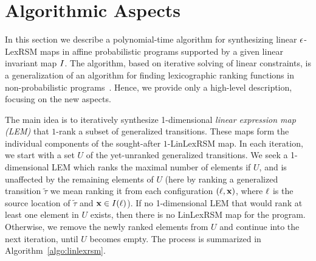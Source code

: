 \section{Algorithmic Aspects}
\label{sec:algo}

In this section we describe a polynomial-time algorithm for synthesizing linear 
$\epsilon$-LexRSM maps in affine probabilistic programs supported by a given linear 
invariant map $I$. The algorithm, based on iterative solving of linear 
constraints, is a generalization of an algorithm for finding 
lexicographic ranking functions in non-probabilistic 
programs~\cite{ADFG10:lexicographic}. Hence, we provide only a high-level 
description, focusing on the new aspects.

The main idea is to iteratively synthesize 1-dimensional {\em linear expression 
map (LEM)} that $1$-rank a subset of generalized transitions. These maps form 
the individual components of the sought-after $1$-LinLexRSM map. In each 
iteration, we start with a set $U$ of the yet-unranked generalized transitions. 
We seek a 1-dimensional LEM which ranks the maximal number of elements if $U$, 
and is unaffected by the remaining elements of $U$ (here by ranking a 
generalized transition $\tilde\tau$ we mean ranking it from each configuration 
$(\ell,\mathbf{x})$, where $\ell$ is the source location of $\tilde\tau$ and 
$\mathbf{x}\in I(\ell)$). If no 1-dimensional LEM that would rank at least one 
element in $U$ exists, then there is no LinLexRSM map for the program. 
Otherwise, we remove the newly ranked elements from $U$ and continue into the 
next iteration, until $U$ becomes empty. The process is summarized in 
Algorithm~\ref{algo:linlexrsm}.

